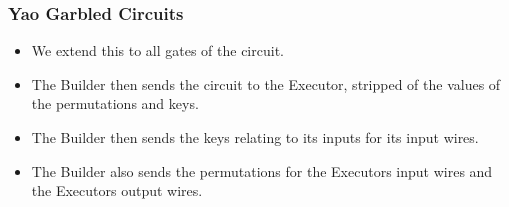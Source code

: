 \documentclass{beamer}
\begin{document}
	\begin{frame}
		\frametitle{Yao Garbled Circuits}
		\begin{itemize}
			\item We extend this to all gates of the circuit.
			\item The Builder then sends the circuit to the Executor, stripped of the values of the permutations and keys.
			\item The Builder then sends the keys relating to its inputs for its input wires.
			\item The Builder also sends the permutations for the Executors input wires and the Executors output wires.
		\end{itemize}

	\end{frame}
\end{document}
